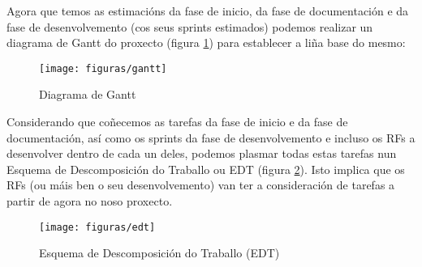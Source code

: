 Agora que temos as estimacións da fase de inicio, da fase de documentación e da fase de desenvolvemento (cos seus sprints estimados) podemos realizar un diagrama de Gantt do proxecto (figura \ref{gantt}) para establecer a liña base do mesmo:

\begin{figure}
\centering
\texttt{[image: figuras/gantt]}
\caption{Diagrama de Gantt}
\label{gantt}
\end{figure}

Considerando que coñecemos as tarefas da fase de inicio e da fase de documentación, así como os sprints da fase de desenvolvemento e incluso os RFs a desenvolver dentro de cada un deles, podemos plasmar todas estas tarefas nun Esquema de Descomposición do Traballo ou EDT (figura \ref{edt}). Isto implica que os RFs (ou máis ben o seu desenvolvemento) van ter a consideración de tarefas a partir de agora no noso proxecto.

\begin{figure}
\centering
\texttt{[image: figuras/edt]}
\caption{Esquema de Descomposición do Traballo (EDT)}
\label{edt}
\end{figure}